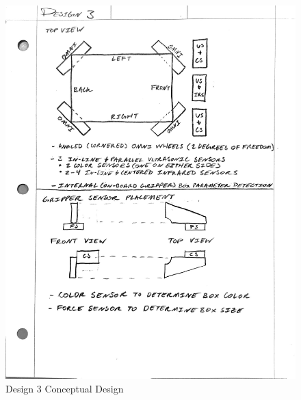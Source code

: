 \documentclass[12pt]{report}
\begin{document}
\begin{figure}[H]
    \centering
    \includegraphics[width=1\textwidth]{Images/Designs/Design3.pdf}
    \caption{Design 3 Conceptual Design}
    \label{fig:design3}
\end{figure}
\end{document}
